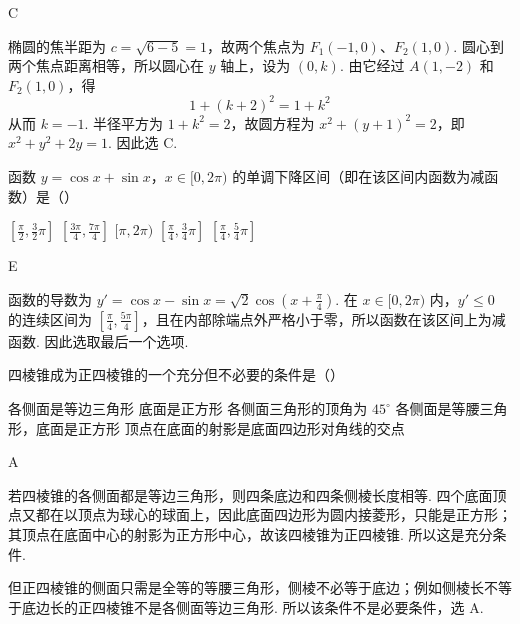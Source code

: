 \begin{answer}
C
\end{answer}

\begin{solution}
椭圆的焦半距为 \(c=\sqrt{6-5}=1\)，故两个焦点为 \(F_1(-1,0)\)、\(F_2(1,0)\). 圆心到两个焦点距离相等，所以圆心在 \(y\) 轴上，设为 \((0,k)\). 由它经过 \(A(1,-2)\) 和 \(F_2(1,0)\)，得
\[
1+(k+2)^2=1+k^2
\]
从而 \(k=-1\). 半径平方为 \(1+k^2=2\)，故圆方程为 \(x^2+(y+1)^2=2\)，即 \(x^2+y^2+2y=1\). 因此选 C.
\end{solution}


\begin{problem}

函数 \(y = \cos x + \sin x\)，\(x \in [0, 2\pi)\) 的单调下降区间（即在该区间内函数为减函数）是（\quad）

\choicesfive
    {\(\left[\frac{\pi}{2},\frac{3}{2}\pi\right]\)}
    {\(\left[\frac{3\pi}{4},\frac{7\pi}{4}\right]\)}
    {\([\pi, 2\pi)\)}
    {\(\left[\frac{\pi}{4},\frac{3}{4}\pi\right]\)}
    {\(\left[\frac{\pi}{4},\frac{5}{4}\pi\right]\)}
\end{problem}

\begin{answer}
E
\end{answer}

\begin{solution}
函数的导数为 \(y'=\cos x-\sin x=\sqrt{2}\cos\left(x+\frac{\pi}{4}\right)\). 在 \(x\in[0,2\pi)\) 内，\(y'\leq0\) 的连续区间为 \([\frac{\pi}{4},\frac{5\pi}{4}]\)，且在内部除端点外严格小于零，所以函数在该区间上为减函数. 因此选取最后一个选项.
\end{solution}


\begin{problem}

四棱锥成为正四棱锥的一个充分但不必要的条件是（\quad）

\choicesfive
    {各侧面是等边三角形}
    {底面是正方形}
    {各侧面三角形的顶角为 \(45^{\circ}\)}
    {各侧面是等腰三角形，底面是正方形}
    {顶点在底面的射影是底面四边形对角线的交点}
\end{problem}

\begin{answer}
A
\end{answer}

\begin{solution}
若四棱锥的各侧面都是等边三角形，则四条底边和四条侧棱长度相等. 四个底面顶点又都在以顶点为球心的球面上，因此底面四边形为圆内接菱形，只能是正方形；其顶点在底面中心的射影为正方形中心，故该四棱锥为正四棱锥. 所以这是充分条件.

但正四棱锥的侧面只需是全等的等腰三角形，侧棱不必等于底边；例如侧棱长不等于底边长的正四棱锥不是各侧面等边三角形. 所以该条件不是必要条件，选 A.
\end{solution}


